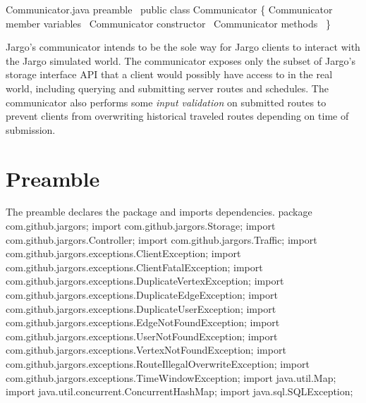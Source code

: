\nwenddocs{}\endmoddef{}
\LA{}Communicator.java preamble~{\nwtagstyle{}}\RA{}
public class Communicator \{
  \LA{}\code{}Communicator\edoc{} member variables~{\nwtagstyle{}}\RA{}
  \LA{}\code{}Communicator\edoc{} constructor~{\nwtagstyle{}}\RA{}
  \LA{}\code{}Communicator\edoc{} methods~{\nwtagstyle{}}\RA{}
\}
\nwendcode{}\nwdocspar

Jargo's communicator intends to be the sole way for Jargo clients to interact
with the Jargo simulated world. The communicator exposes only the subset of
Jargo's storage interface API that a client would possibly have access to in
the real world, including querying and submitting server routes and schedules.
The communicator also performs some \emph{input validation} on submitted routes
to prevent clients from overwriting historical traveled routes depending on
time of submission.

\section{Preamble}
The preamble declares the package and imports dependencies.
\nwenddocs{}\endmoddef{}
package com.github.jargors;
\nwendcode{}\nwdocspar
\nwenddocs{}\plusendmoddef
import com.github.jargors.Storage;
import com.github.jargors.Controller;
import com.github.jargors.Traffic;
import com.github.jargors.exceptions.ClientException;
import com.github.jargors.exceptions.ClientFatalException;
import com.github.jargors.exceptions.DuplicateVertexException;
import com.github.jargors.exceptions.DuplicateEdgeException;
import com.github.jargors.exceptions.DuplicateUserException;
import com.github.jargors.exceptions.EdgeNotFoundException;
import com.github.jargors.exceptions.UserNotFoundException;
import com.github.jargors.exceptions.VertexNotFoundException;
import com.github.jargors.exceptions.RouteIllegalOverwriteException;
import com.github.jargors.exceptions.TimeWindowException;
import java.util.Map;
import java.util.concurrent.ConcurrentHashMap;
import java.sql.SQLException;
\nwendcode{}\nwdocspar

